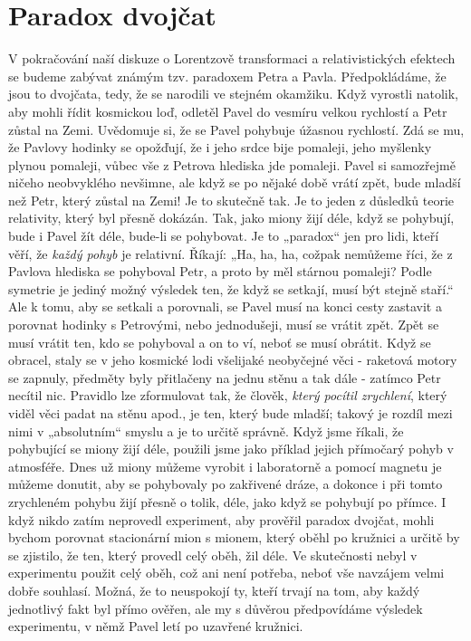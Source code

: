   \section{Paradox dvojčat}\label{fyz:IchapXVIsecII}
    V pokračování naší diskuze o Lorentzově transformaci a relativistických efektech se budeme 
    zabývat známým tzv. paradoxem Petra a Pavla. Předpokládáme, že jsou to dvojčata, tedy, že se 
    narodili ve stejném okamžiku. Když vyrostli natolik, aby mohli řídit kosmickou loď, odletěl 
    Pavel do vesmíru velkou rychlostí a Petr zůstal na Zemi. Uvědomuje si, že se Pavel pohybuje 
    úžasnou rychlostí. Zdá se mu, že Pavlovy hodinky se opožďují, že i jeho srdce bije pomaleji, 
    jeho myšlenky plynou pomaleji, vůbec vše z Petrova hlediska jde pomaleji. Pavel si samozřejmě 
    ničeho neobvyklého nevšimne, ale když se po nějaké době vrátí zpět, bude mladší než Petr, který 
    zůstal na Zemi! Je to skutečně tak. Je to jeden z důsledků teorie relativity, který byl přesně 
    dokázán. Tak, jako miony žijí déle, když se pohybují, bude i Pavel žít déle, bude-li se 
    pohybovat. Je to „paradox“ jen pro lidi, kteří věří, že \emph{každý pohyb} je relativní. 
    Říkají: „Ha, ha, ha, cožpak nemůžeme říci, že z Pavlova hlediska se pohyboval Petr, a proto by 
    měl stárnou pomaleji? Podle symetrie je jediný možný výsledek ten, že když se setkají, musí být 
    stejně staří.“ Ale k tomu, aby se setkali a porovnali, se Pavel musí na konci cesty zastavit a 
    porovnat hodinky s Petrovými, nebo jednodušeji, musí se vrátit zpět. Zpět se musí vrátit ten, 
    kdo se pohyboval a on to ví, neboť se musí obrátit. Když se obracel, staly se v jeho kosmické 
    lodi všelijaké neobyčejné věci - raketová motory se zapnuly, předměty byly přitlačeny na jednu 
    stěnu a tak dále - zatímco Petr necítil nic. Pravidlo lze zformulovat tak, že člověk, 
    \emph{který pocítil zrychlení}, který viděl věci padat na stěnu apod., je ten, který bude 
    mladší; takový je rozdíl mezi nimi v „absolutním“ smyslu a je to určitě správně. Když jsme 
    říkali, že pohybující se miony žijí déle, použili jsme jako příklad jejich přímočarý pohyb v 
    atmosféře. Dnes už miony můžeme vyrobit i laboratorně a pomocí magnetu je můžeme donutit, aby 
    se pohybovaly po zakřivené dráze, a dokonce i při tomto zrychleném pohybu žijí přesně o tolik, 
    déle, jako když se pohybují po přímce. I když nikdo zatím neprovedl experiment, aby prověřil 
    paradox dvojčat, mohli bychom porovnat stacionární mion s mionem, který oběhl po kružnici a 
    určitě by se zjistilo, že ten, který provedl celý oběh, žil déle. Ve skutečnosti nebyl v 
    experimentu použit celý oběh, což ani není potřeba, neboť vše navzájem velmi dobře souhlasí. 
    Možná, že to neuspokojí ty, kteří trvají na tom, aby každý jednotlivý fakt byl přímo ověřen, 
    ale my s důvěrou předpovídáme výsledek experimentu, v němž Pavel letí po uzavřené kružnici.
    
